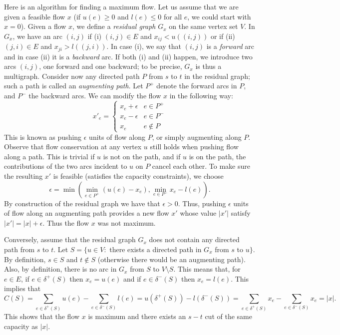 \documentclass[12pt]{article}
\begin{document}
Here is an algorithm for finding a maximum flow. Let us assume that we
are given a feasible flow $x$ (if $u(e)\geq 0$ and $l(e)\leq 0$ for
all $e$, we could start with $x=0$). Given a flow $x$, we define a
{\it residual graph} $G_x$ on the same vertex set $V$. In $G_x$, we
have an arc $(i,j)$ if (i) $(i,j)\in E$ and $x_{ij}<u((i,j))$ or if
(ii) $(j,i)\in E$ and $x_{ji}> l((j,i))$. In case (i), we say that
$(i,j)$ is a {\it forward} arc and in case (ii) it is a {\it backward} arc. If
both (i) and (ii) happen, we introduce two arcs $(i,j)$, one forward
and one backward; to be precise, $G_x$ is thus a multigraph. Consider
now any directed path $P$ from $s$ to $t$ in the residual graph; such
a path is called an {\it augmenting path}. Let $P^+$ denote the
forward arcs in $P$, and $P^-$ the backward arcs. We can modify the flow
$x$ in the following way:
$$x'_e=\left\{\begin{array}{ll} x_e + \epsilon & e\in P^+ \\ x_e
    -\epsilon & e\in P^- \\  x_e & e\notin P \end{array}\right.$$ This
is known as  pushing $\epsilon$ units of flow along $P$, or simply
augmenting along $P$. 
Observe that flow conservation at any vertex $u$ still holds when
pushing flow along a path. This is trivial if $u$ is not on the path,
and if $u$ is on the path, the contributions of the two arcs incident
to $u$ on $P$ cancel each other. To make sure the resulting  $x'$
is feasible (satisfies the capacity constraints), we choose 
$$\epsilon = \min\left(\min_{e\in P^+} (u(e)-x_e),\min_{e\in P^-}
  x_e-l(e)\right).$$ By construction of the residual graph we have
that $\epsilon>0$. Thus, pushing $\epsilon$ units of flow along an
augmenting path provides a new flow $x'$ whose value $|x'|$ satisfy
$|x'|=|x|+\epsilon$. Thus the flow $x$ was not maximum. 

Conversely, assume that the residual graph $G_x$ does not contain any
directed path from $s$ to $t$. Let $S=\{u\in V:$ there exists a
directed path in $G_x$ from $s$ to $u\}$. By definition, $s\in S$ and
$t\notin S$ (otherwise there would be an augmenting path). Also, by
definition, there is no arc in $G_x$ from $S$ to $V\setminus S$. This
means that, for $e\in E$, if $e\in \delta^+(S)$ then $x_e=u(e)$ and if
$e\in \delta^-(S)$ then $x_e=l(e)$. This implies that 
$$C(S)=\sum_{e\in \delta^+(S)} u(e) -\sum_{e\in \delta^-(S)} l(e) =
u(\delta^+(S)) - l(\delta^-(S)) = \sum_{e\in \delta^+(S)} x_e
-\sum_{e\in \delta^-(S)} x_e = |x|.$$ 
This shows that the flow $x$ is maximum and there exists an $s-t$ cut
of the same capacity as $|x|$. 
\end{document}
